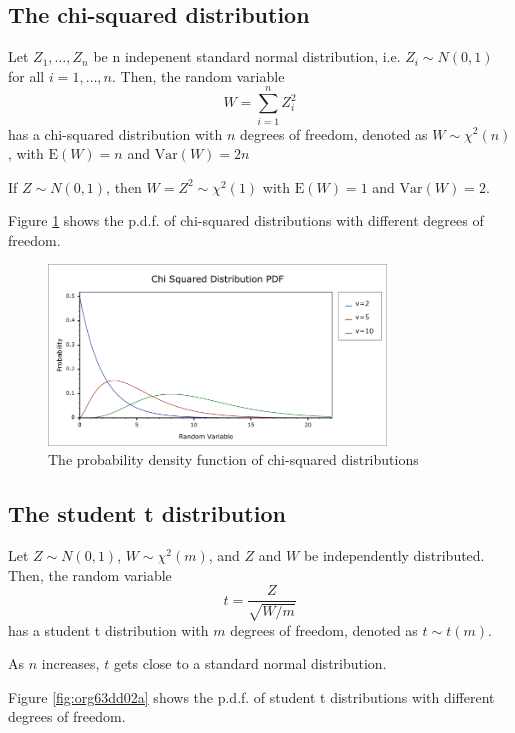 \documentclass[a4paper,11pt]{article}
\begin{document}
\subsection{The chi-squared distribution}
\label{sec:org8f25e38}

Let \(Z_1, \ldots, Z_n\) be n indepenent standard normal distribution,
i.e. \(Z_i \sim N(0, 1)\) for all \(i = 1, \ldots, n\). Then, the random
variable
\[W = \sum_{i=1}^n Z^2_i \]
has a chi-squared distribution with \(n\) degrees of freedom, denoted as
\(W \sim \chi^2(n)\), with \(\mathrm{E}(W) = n\) and \(\mathrm{Var}(W) = 2n\)

If \(Z \sim N(0, 1)\), then \(W = Z^2 \sim \chi^2(1)\) with \(\mathrm{E}(W) =
1\) and \(\mathrm{Var}(W) = 2\).

Figure \ref{fig:org66d13ab} shows the p.d.f. of chi-squared distributions
with different degrees of freedom. 

\begin{figure}[htbp]
\centering
\includegraphics[width=0.8\textwidth]{figure/chi_squared_pdf.png}
\caption{\label{fig:org66d13ab}
The probability density function of chi-squared distributions}
\end{figure}


\subsection{The student t distribution}
\label{sec:org3862676}

Let \(Z \sim N(0, 1)\), \(W \sim \chi^2(m)\), and \(Z\) and \(W\) be
independently distributed. Then, the random variable
\[t = \frac{Z}{\sqrt{W/m}} \]
has a student t distribution with \(m\) degrees of freedom, denoted as
\(t \sim t(m)\).

As \(n\) increases, \(t\) gets close to a standard normal distribution.

Figure \ref{fig:org63dd02a} shows the p.d.f. of student t distributions
with different degrees of freedom. 
\end{document}
